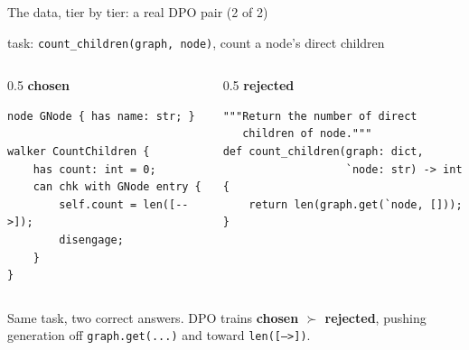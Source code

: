 \documentclass[aspectratio=169,11pt]{beamer}
\begin{document}
\begin{frame}[fragile]{The data, tier by tier: a real DPO pair (2 of 2)}
  \begin{center}{\scriptsize task: \texttt{count\_children(graph, node)}, count a node's direct children}\end{center}
  \begin{columns}[t]
    \begin{column}{0.5\textwidth}
      \centering\textbf{chosen} 
      \begin{lstlisting}[style=code,language=Jac,basicstyle=\ttfamily\tiny\color{ink}]
node GNode { has name: str; }

walker CountChildren {
    has count: int = 0;
    can chk with GNode entry {
        self.count = len([-->]);
        disengage;
    }
}
      \end{lstlisting}
    \end{column}
    \begin{column}{0.5\textwidth}
      \centering\textbf{rejected} 
      \begin{lstlisting}[style=code,language=Jac,basicstyle=\ttfamily\tiny\color{ink}]
"""Return the number of direct
   children of node."""
def count_children(graph: dict,
                   `node: str) -> int {
    return len(graph.get(`node, []));
}
      \end{lstlisting}
    \end{column}
  \end{columns}
  \vspace{1mm}
  \begin{center}\small
   Same task, two correct answers. DPO trains \textbf{chosen $\succ$ rejected}, pushing
   generation off \texttt{graph.get(...)} and toward \texttt{len([-->])}.
  \end{center}
\end{frame}
\end{document}
